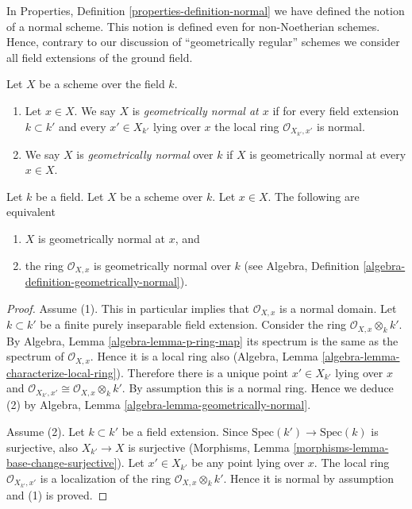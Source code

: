 \noindent
In Properties, Definition \ref{properties-definition-normal}
we have defined the notion of a normal scheme.
This notion is defined even for non-Noetherian
schemes. Hence, contrary to our discussion of
``geometrically regular'' schemes we consider all
field extensions of the ground field.

\begin{definition}
\label{definition-geometrically-normal}
Let $X$ be a scheme over the field $k$.
\begin{enumerate}
\item Let $x \in X$. We say $X$ is
{\it geometrically normal at $x$} if for every
field extension $k \subset k'$ and every $x' \in X_{k'}$ lying over $x$
the local ring $\mathcal{O}_{X_{k'}, x'}$ is normal.
\item We say $X$ is {\it geometrically normal} over $k$ if $X$
is geometrically normal at every $x \in X$.
\end{enumerate}
\end{definition}

\begin{lemma}
\label{lemma-geometrically-normal-at-point}
Let $k$ be a field.
Let $X$ be a scheme over $k$.
Let $x \in X$.
The following are equivalent
\begin{enumerate}
\item $X$ is geometrically normal at $x$, and
\item the ring $\mathcal{O}_{X, x}$ is geometrically
normal over $k$ (see
Algebra, Definition \ref{algebra-definition-geometrically-normal}).
\end{enumerate}
\end{lemma}

\begin{proof}
Assume (1). This in particular implies that $\mathcal{O}_{X, x}$
is a normal domain. Let $k \subset k'$ be a finite purely inseparable field
extension. Consider the ring $\mathcal{O}_{X, x} \otimes_k k'$.
By Algebra, Lemma \ref{algebra-lemma-p-ring-map}
its spectrum is the same as the spectrum of $\mathcal{O}_{X, x}$.
Hence it is a local ring also
(Algebra, Lemma \ref{algebra-lemma-characterize-local-ring}).
Therefore there is a unique point $x' \in X_{k'}$ lying over $x$
and $\mathcal{O}_{X_{k'}, x'} \cong \mathcal{O}_{X, x} \otimes_k k'$.
By assumption this is a normal ring. Hence we deduce (2) by
Algebra, Lemma
\ref{algebra-lemma-geometrically-normal}.

\medskip\noindent
Assume (2). Let $k \subset k'$ be a field extension. Since
$\text{Spec}(k') \to \text{Spec}(k)$ is surjective, also
$X_{k'} \to X$ is surjective
(Morphisms, Lemma \ref{morphisms-lemma-base-change-surjective}).
Let $x' \in X_{k'}$ be any point lying over $x$.
The local ring $\mathcal{O}_{X_{k'}, x'}$
is a localization of the ring $\mathcal{O}_{X, x} \otimes_k k'$.
Hence it is normal by assumption and (1) is proved.
\end{proof}

